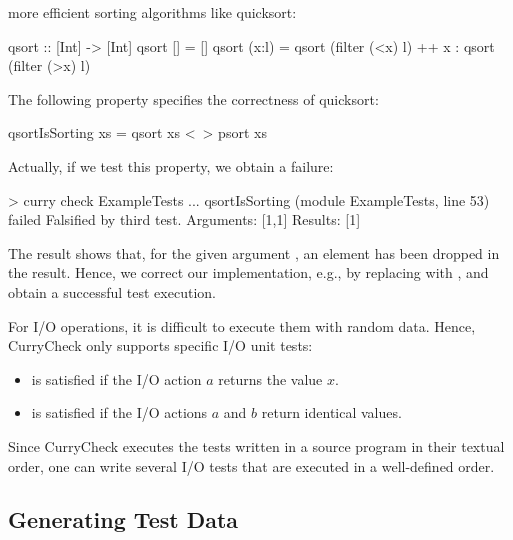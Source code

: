 more efficient sorting algorithms like quicksort:
\begin{curry}
qsort :: [Int] -> [Int] 
qsort []     = []
qsort (x:l)  = qsort (filter (<x) l) ++ x : qsort (filter (>x) l)
\end{curry}
The following property specifies the correctness of quicksort:
\begin{curry}
qsortIsSorting xs = qsort xs <~> psort xs
\end{curry}
Actually, if we test this property, we obtain a failure:
%
\begin{curry}
> curry check ExampleTests
...
qsortIsSorting (module ExampleTests, line 53) failed
Falsified by third test.
Arguments:
[1,1]
Results:
[1]
\end{curry}
%
The result shows that, for the given argument \code{[1,1]},
an element has been dropped in the result.
Hence, we correct our implementation, e.g., by replacing
 with , and obtain a successful test execution.

For I/O operations, it is difficult to execute them with random data.
Hence, CurryCheck only supports specific I/O unit tests:
\begin{itemize}
\item {} is satisfied if the I/O action $a$
returns the value $x$.
\item {} is satisfied if the I/O actions
$a$ and $b$ return identical values.
\end{itemize}
%
Since CurryCheck executes the tests written in a source program
in their textual order, one can write several I/O tests that are
executed in a well-defined order.


\subsection{Generating Test Data}

